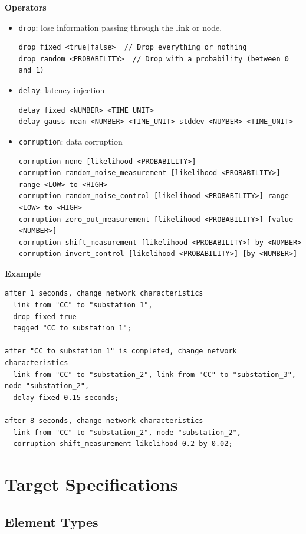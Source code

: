 \documentclass[12pt]{article}
\begin{document}
\textbf{Operators}

\begin{itemize}
  \item \texttt{drop}: lose information passing through the link or node.
\begin{lstlisting}
drop fixed <true|false>  // Drop everything or nothing
drop random <PROBABILITY>  // Drop with a probability (between 0 and 1)
\end{lstlisting}

  \item \texttt{delay}: latency injection
\begin{lstlisting}
delay fixed <NUMBER> <TIME_UNIT>
delay gauss mean <NUMBER> <TIME_UNIT> stddev <NUMBER> <TIME_UNIT>
\end{lstlisting}

  \item \texttt{corruption}: data corruption
\begin{lstlisting}
corruption none [likelihood <PROBABILITY>]
corruption random_noise_measurement [likelihood <PROBABILITY>] range <LOW> to <HIGH>
corruption random_noise_control [likelihood <PROBABILITY>] range <LOW> to <HIGH>
corruption zero_out_measurement [likelihood <PROBABILITY>] [value <NUMBER>]
corruption shift_measurement [likelihood <PROBABILITY>] by <NUMBER>
corruption invert_control [likelihood <PROBABILITY>] [by <NUMBER>]
\end{lstlisting}
\end{itemize}

\textbf{Example}
\begin{lstlisting}
after 1 seconds, change network characteristics
  link from "CC" to "substation_1",
  drop fixed true
  tagged "CC_to_substation_1";

after "CC_to_substation_1" is completed, change network characteristics
  link from "CC" to "substation_2", link from "CC" to "substation_3", node "substation_2",
  delay fixed 0.15 seconds;

after 8 seconds, change network characteristics
  link from "CC" to "substation_2", node "substation_2",
  corruption shift_measurement likelihood 0.2 by 0.02;
\end{lstlisting}

\section{Target Specifications}

\subsection{Element Types}
\end{document}

